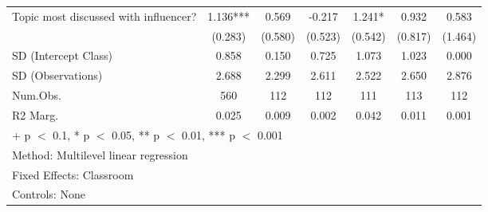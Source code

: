 \documentclass[
  letterpaper,
  DIV=11,
  numbers=noendperiod]{scrreprt}
\begin{document}
\begin{table}
\begin{tabular}[t]{lcccccc}
\hspace{1em}Topic most discussed with influencer? & 1.136*** & 0.569 & -0.217 & 1.241* & 0.932 & 0.583\\
\hspace{1em} & (0.283) & (0.580) & (0.523) & (0.542) & (0.817) & (1.464)\\
\hspace{1em}SD (Intercept Class) & 0.858 & 0.150 & 0.725 & 1.073 & 1.023 & 0.000\\
\hspace{1em}SD (Observations) & 2.688 & 2.299 & 2.611 & 2.522 & 2.650 & 2.876\\
\hspace{1em}Num.Obs. & 560 & 112 & 112 & 111 & 113 & 112\\
\hspace{1em}R2 Marg. & 0.025 & 0.009 & 0.002 & 0.042 & 0.011 & 0.001\\
\bottomrule
\multicolumn{7}{l}{\rule{0pt}{1em}+ p $<$ 0.1, * p $<$ 0.05, ** p $<$ 0.01, *** p $<$ 0.001}\\
\multicolumn{7}{l}{\rule{0pt}{1em}Method: Multilevel linear regression}\\
\multicolumn{7}{l}{\rule{0pt}{1em}Fixed Effects: Classroom}\\
\multicolumn{7}{l}{\rule{0pt}{1em}Controls: None}\\
\end{tabular}
\end{table}
\end{document}
